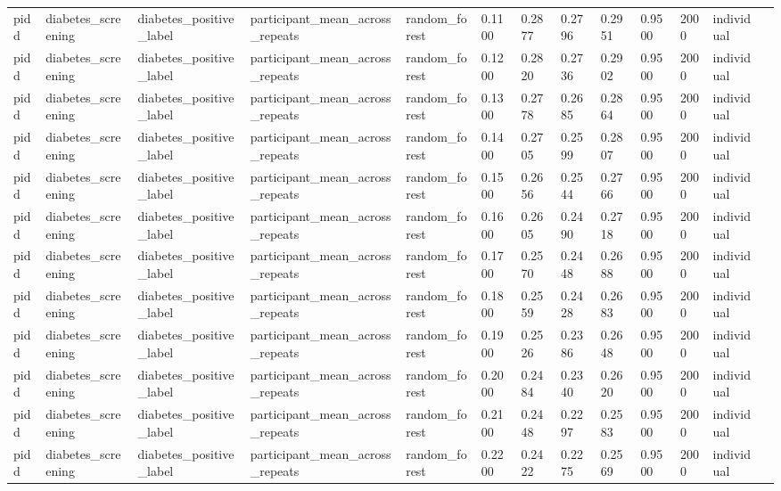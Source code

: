\begin{tabular}{lllllllllllll}
pidd & diabetes\_screening & diabetes\_positive\_label & participant\_mean\_across\_repeats & random\_forest & 0.1100 & 0.2877 & 0.2796 & 0.2951 & 0.9500 & 2000 & individual &  \\
pidd & diabetes\_screening & diabetes\_positive\_label & participant\_mean\_across\_repeats & random\_forest & 0.1200 & 0.2820 & 0.2736 & 0.2902 & 0.9500 & 2000 & individual &  \\
pidd & diabetes\_screening & diabetes\_positive\_label & participant\_mean\_across\_repeats & random\_forest & 0.1300 & 0.2778 & 0.2685 & 0.2864 & 0.9500 & 2000 & individual &  \\
pidd & diabetes\_screening & diabetes\_positive\_label & participant\_mean\_across\_repeats & random\_forest & 0.1400 & 0.2705 & 0.2599 & 0.2807 & 0.9500 & 2000 & individual &  \\
pidd & diabetes\_screening & diabetes\_positive\_label & participant\_mean\_across\_repeats & random\_forest & 0.1500 & 0.2656 & 0.2544 & 0.2766 & 0.9500 & 2000 & individual &  \\
pidd & diabetes\_screening & diabetes\_positive\_label & participant\_mean\_across\_repeats & random\_forest & 0.1600 & 0.2605 & 0.2490 & 0.2718 & 0.9500 & 2000 & individual &  \\
pidd & diabetes\_screening & diabetes\_positive\_label & participant\_mean\_across\_repeats & random\_forest & 0.1700 & 0.2570 & 0.2448 & 0.2688 & 0.9500 & 2000 & individual &  \\
pidd & diabetes\_screening & diabetes\_positive\_label & participant\_mean\_across\_repeats & random\_forest & 0.1800 & 0.2559 & 0.2428 & 0.2683 & 0.9500 & 2000 & individual &  \\
pidd & diabetes\_screening & diabetes\_positive\_label & participant\_mean\_across\_repeats & random\_forest & 0.1900 & 0.2526 & 0.2386 & 0.2648 & 0.9500 & 2000 & individual &  \\
pidd & diabetes\_screening & diabetes\_positive\_label & participant\_mean\_across\_repeats & random\_forest & 0.2000 & 0.2484 & 0.2340 & 0.2620 & 0.9500 & 2000 & individual &  \\
pidd & diabetes\_screening & diabetes\_positive\_label & participant\_mean\_across\_repeats & random\_forest & 0.2100 & 0.2448 & 0.2297 & 0.2583 & 0.9500 & 2000 & individual &  \\
pidd & diabetes\_screening & diabetes\_positive\_label & participant\_mean\_across\_repeats & random\_forest & 0.2200 & 0.2422 & 0.2275 & 0.2569 & 0.9500 & 2000 & individual &  \\

\end{tabular}
